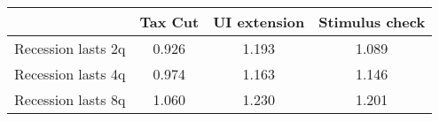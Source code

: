 \begin{tabular}{@{}lccc@{}} 
\toprule 
& Tax Cut    & UI extension    & Stimulus check    \\  \midrule 
Recession lasts 2q &0.926  & 1.193  & 1.089     \\ 
Recession lasts 4q &0.974  & 1.163  & 1.146     \\ 
Recession lasts 8q &1.060  & 1.230  & 1.201     \\ 
\end{tabular}  

